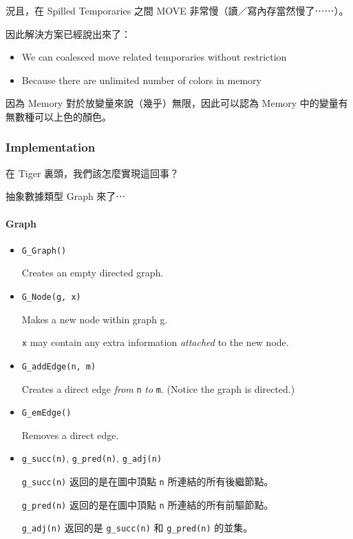 \documentclass[
]{article}
\begin{document}
況且，在 Spilled Temporaries 之間 MOVE 非常慢（讀／寫內存當然慢了⋯⋯）。

因此解決方案已經說出來了：

\begin{itemize}
\item
  We can coalesced move related temporaries without restriction
\item
  Because there are unlimited number of colors in memory
\end{itemize}

因為 Memory 對於放變量來說（幾乎）無限，因此可以認為 Memory
中的變量有無數種可以上色的顏色。

\hypertarget{header-n43}{%
\subsubsection{Implementation}\label{header-n43}}

在 Tiger 裏頭，我們該怎麼實現這回事？

抽象數據類型 Graph 來了⋯

\hypertarget{header-n46}{%
\paragraph{Graph}\label{header-n46}}

\begin{itemize}
\item
  \texttt{G\_Graph()}

  Creates an empty directed graph.
\item
  \texttt{G\_Node(g,\ x)}

  Makes a new node within graph g.

  \texttt{x} may contain any extra information \emph{attached} to the
  new node.
\item
  \texttt{G\_addEdge(n,\ m)}

  Creates a direct edge \emph{from} \texttt{n} \emph{to} \texttt{m}.
  (Notice the graph is directed.)
\item
  \texttt{G\_emEdge()}

  Removes a direct edge.
\item
  \texttt{g\_succ(n)}, \texttt{g\_pred(n)}, \texttt{g\_adj(n)}

  \texttt{g\_succ(n)} 返回的是在圖中頂點 \texttt{n}
  所連結的所有後繼節點。

  \texttt{g\_pred(n)} 返回的是在圖中頂點 \texttt{n}
  所連結的所有前驅節點。

  \texttt{g\_adj(n)} 返回的是 \texttt{g\_succ(n)} 和 \texttt{g\_pred(n)}
  的並集。
\end{itemize}
\end{document}

